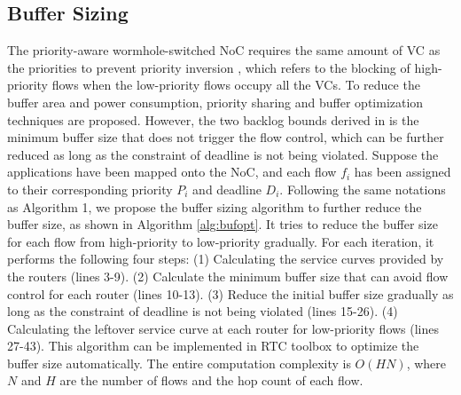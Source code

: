\documentclass[10pt,journal]{IEEEtran}
\begin{document}
\subsection{Buffer Sizing}\label{bufferopt}
The priority-aware wormhole-switched NoC \cite{Shi:2008:RCA:1397757.1397996} requires the same amount of VC as the priorities to prevent priority inversion \cite{707545}, which refers to the blocking of high-priority flows when the low-priority flows occupy all the VCs. To reduce the buffer area and power consumption, priority sharing \cite{5161497} and buffer optimization \cite{189} techniques are proposed. However, the two backlog bounds derived in \cite{189} is the minimum buffer size that does not trigger the flow control, which can be further reduced as long as the constraint of deadline is not being violated. Suppose the applications have been mapped onto the NoC, and each flow $f_i$ has been assigned to their corresponding priority $P_i$ and deadline $D_i$. Following the same notations as Algorithm 1, we propose the buffer sizing algorithm to further reduce the buffer size, as shown in Algorithm \ref{alg:bufopt}. It tries to reduce the buffer size for each flow from high-priority to low-priority gradually. For each iteration, it performs the following four steps: (1) Calculating the service curves provided by the routers (lines 3-9). (2) Calculate the minimum buffer size that can avoid flow control for each router (lines 10-13). (3) Reduce the initial buffer size gradually as long as the constraint of deadline is not being violated (lines 15-26). (4) Calculating the leftover service curve at each router for low-priority flows (lines 27-43). This algorithm can be implemented in RTC toolbox \cite{rtc} to optimize the buffer size automatically. The entire computation complexity is $O(HN)$, where $N$ and $H$ are the number of flows and the hop count of each flow.
\end{document}
